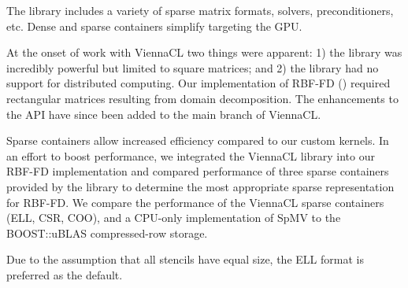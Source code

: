 \documentclass{report}
\begin{document}
The library includes a variety of sparse matrix formats, solvers, preconditioners, etc. Dense and sparse containers simplify targeting the GPU. 

At the onset of work with ViennaCL two things were apparent: 1) the library was incredibly powerful but limited to square matrices; and 2) the library had no support for distributed computing. Our implementation of RBF-FD (\cite{BolligRBFFDCode}) required rectangular matrices resulting from domain decomposition. The enhancements to the API have since been added to the main branch of ViennaCL. 


Sparse containers allow increased efficiency compared to our custom kernels. 
In an effort to boost performance, we integrated the ViennaCL library into our RBF-FD implementation and compared performance of three sparse containers provided by the library to determine the most appropriate sparse representation for RBF-FD. We compare the performance of the ViennaCL sparse containers (ELL, CSR, COO), and a CPU-only implementation of SpMV to the BOOST::uBLAS compressed-row storage. 

Due to the assumption that all stencils have equal size, the ELL format is preferred as the default. 


\end{document}
